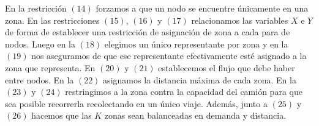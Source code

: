 En la restricción $(14)$ forzamos a que un nodo se encuentre únicamente en una zona. En las restricciones $(15)$, $(16)$ y $(17)$ relacionamos las variables $X$ e $Y$ de forma de establecer una restricción de asignación de zona a cada para de nodos. Luego en la $(18)$ elegimos un único representante por zona y en la $(19)$ nos aseguramos de que ese representante efectivamente esté asignado a la zona que representa. En $(20)$ y $(21)$ establecemos el flujo que debe haber entre nodos. En la $(22)$ asignamos la distancia máxima de cada zona. En la $(23)$ y $(24)$ restringimos a la zona contra la capacidad del camión para que sea posible recorrerla recolectando en un único viaje. Además, junto a $(25)$ y $(26)$ hacemos que las $K$ zonas sean balanceadas en demanda y distancia.